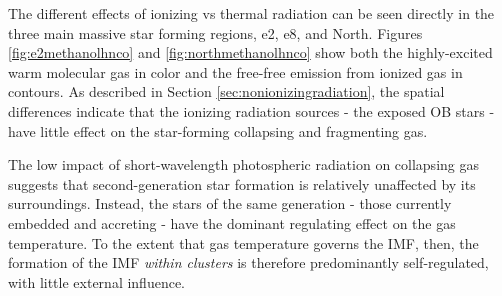 \documentclass[twocolumn]{aastex61}
\begin{document}
The different effects of ionizing vs thermal radiation can be seen directly in
the three main massive star forming regions, e2, e8, and North.  Figures
\ref{fig:e2methanolhnco} and \ref{fig:northmethanolhnco} show both the
highly-excited warm molecular gas in color and the free-free emission from
ionized gas in contours.  As described in Section
\ref{sec:nonionizingradiation}, the spatial differences indicate that the
ionizing radiation sources - the exposed OB stars - have little effect on the
star-forming collapsing and fragmenting gas.

The low impact of short-wavelength photospheric radiation on collapsing gas
suggests that second-generation star formation is relatively unaffected by its
surroundings.  Instead, the stars of the same generation - those currently
embedded and accreting - have the dominant regulating effect on the gas
temperature.  To the extent that gas temperature governs the IMF, then, the
formation of the IMF \emph{within clusters} is therefore predominantly
self-regulated, with little external influence.




\end{document}
